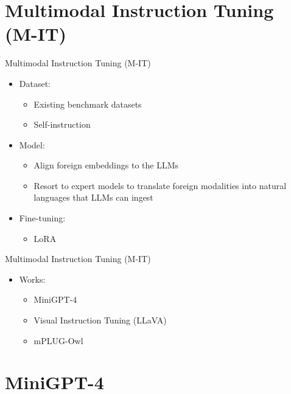 \documentclass[aspectratio=1610,xcolor={dvipsnames},hyperref={colorlinks,unicode,linkcolor=violet,anchorcolor=BlueViolet,citecolor=YellowOrange,filecolor=black,urlcolor=Aquamarine}]{beamer}
\begin{document}
\section{Multimodal Instruction Tuning (M-IT)}
\label{sec:org8bdfd34}

\begin{frame}[label={sec:orgcc40a04}]{Multimodal Instruction Tuning (M-IT)}
\begin{itemize}
\item Dataset:
\begin{itemize}
\item Existing benchmark datasets
\item Self-instruction
\end{itemize}
\item Model:
\begin{itemize}
\item Align foreign embeddings to the LLMs
\item Resort to expert models to translate foreign modalities into natural languages that LLMs can ingest
\end{itemize}
\item Fine-tuning:
\begin{itemize}
\item LoRA
\end{itemize}
\end{itemize}
\end{frame}

\begin{frame}[label={sec:orgbc4bd68}]{Multimodal Instruction Tuning (M-IT)}
\begin{itemize}
\item Works:
\begin{itemize}
\item MiniGPT-4
\item Visual Instruction Tuning (LLaVA) 
\item mPLUG-Owl
\end{itemize}
\end{itemize}
\end{frame}

\section{MiniGPT-4}
\label{sec:org372cd96}
\end{document}
